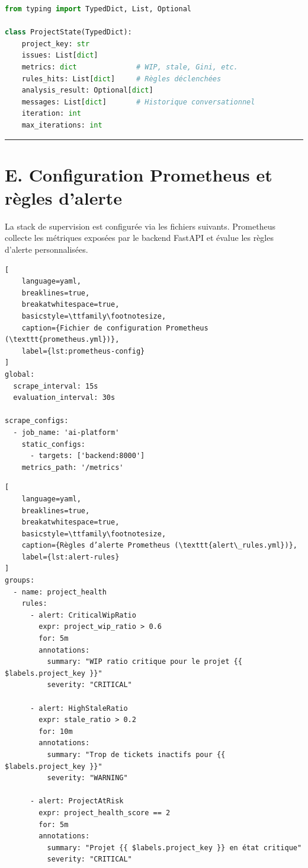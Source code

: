 \begin{lstlisting}[language=Python, caption={TypedDict de l’état du graphe LangGraph}, label={lst:langgraph-state}]
from typing import TypedDict, List, Optional

class ProjectState(TypedDict):
    project_key: str
    issues: List[dict]
    metrics: dict              # WIP, stale, Gini, etc.
    rules_hits: List[dict]     # Règles déclenchées
    analysis_result: Optional[dict]
    messages: List[dict]       # Historique conversationnel
    iteration: int
    max_iterations: int
\end{lstlisting}

\vspace{0.3cm}
\noindent\rule{\linewidth}{0.2pt}
\vspace{0.3cm}

\section*{E. Configuration Prometheus et règles d’alerte}

La stack de supervision est configurée via les fichiers suivants. Prometheus collecte les métriques exposées par le backend FastAPI et évalue les règles d’alerte personnalisées.

\begin{lstlisting}[
    language=yaml,
    breaklines=true,
    breakatwhitespace=true,
    basicstyle=\ttfamily\footnotesize,
    caption={Fichier de configuration Prometheus (\texttt{prometheus.yml})},
    label={lst:prometheus-config}
]
global:
  scrape_interval: 15s
  evaluation_interval: 30s

scrape_configs:
  - job_name: 'ai-platform'
    static_configs:
      - targets: ['backend:8000']
    metrics_path: '/metrics'
\end{lstlisting}

\begin{lstlisting}[
    language=yaml,
    breaklines=true,
    breakatwhitespace=true,
    basicstyle=\ttfamily\footnotesize,
    caption={Règles d’alerte Prometheus (\texttt{alert\_rules.yml})},
    label={lst:alert-rules}
]
groups:
  - name: project_health
    rules:
      - alert: CriticalWipRatio
        expr: project_wip_ratio > 0.6
        for: 5m
        annotations:
          summary: "WIP ratio critique pour le projet {{ $labels.project_key }}"
          severity: "CRITICAL"
      
      - alert: HighStaleRatio
        expr: stale_ratio > 0.2
        for: 10m
        annotations:
          summary: "Trop de tickets inactifs pour {{ $labels.project_key }}"
          severity: "WARNING"
      
      - alert: ProjectAtRisk
        expr: project_health_score == 2
        for: 5m
        annotations:
          summary: "Projet {{ $labels.project_key }} en état critique"
          severity: "CRITICAL"
\end{lstlisting}

